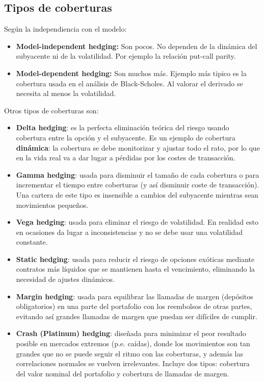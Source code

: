 \subsection{Tipos de coberturas}
Según la independiencia con el modelo:
\begin{itemize}
    \item \textbf{Model-independent hedging:} Son pocos. No dependen de la dinámica del subyacente ni de la volatilidad. Por ejemplo la relación put-call parity.
    \item \textbf{Model-dependent hedging:} Son muchos más. Ejemplo más tipico es la cobertura usada en el análisis de Black-Scholes. Al valorar el derivado se necesita al menos la volatilidad.
\end{itemize}
Otros tipos de coberturas son:
\begin{itemize}
    \item \textbf{Delta hedging}: es la perfecta eliminación teórica del riesgo usando cobertura entre la opción y el subyacente. Es un ejemplo de cobertura \textbf{dinámica}: la cobertura se debe monitorizar y ajustar todo el rato, por lo que en la vida real va a dar lugar a pérdidas por los costes de transacción.
    \item \textbf{Gamma hedging}: usada para disminuir el tamaño de cada cobertura o para incrementar el tiempo entre coberturas (y así disminuir coste de transacción). Una cartera de este tipo es insensible a cambios del subyacente mientras sean movimientos pequeños. 
    \item \textbf{Vega hedging}: usada para eliminar el riesgo de volatilidad. En realidad esto en ocasiones da lugar a inconsistencias y no se debe usar una volatilidad constante.
    \item \textbf{Static hedging}: usada para reducir el riesgo de opciones exóticas mediante contratos más líquidos que se mantienen hasta el vencimiento, eliminando la necesidad de ajustes dinámicos.
    \item \textbf{Margin hedging}: usada para equilibrar las llamadas de margen (depósitos obligatorios) en una parte del portafolio con los reembolsos de otras partes, evitando así grandes llamadas de margen que puedan ser difíciles de cumplir.
    \item \textbf{Crash (Platinum) hedging}: diseñada para minimizar el peor resultado posible en mercados extremos (p.e. caídas), donde los movimientos son tan grandes que no se puede seguir el ritmo con las coberturas, y además las correlaciones normales se vuelven irrelevantes. Incluye dos tipos: cobertura del valor nominal del portafolio y cobertura de llamadas de margen.
\end{itemize}






